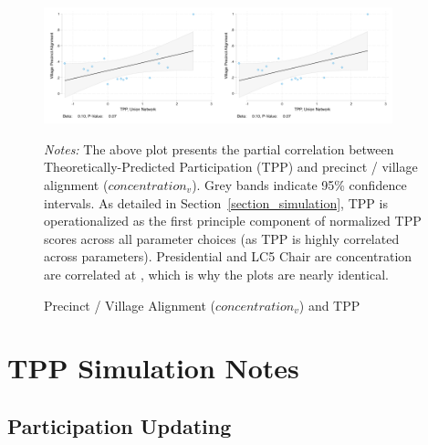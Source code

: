 \documentclass[12pt]{article}
\begin{document}
\begin{appendix}
\begin{figure}[h!]
\begin{center}
  \caption{Precinct / Village Alignment ($concentration_{v}$) and TPP}\label{figure_concentration_and_tpp}
\includegraphics[width=0.45\textwidth]{../3_results/precinct_alignment_pres.pdf}\includegraphics[width=0.45\textwidth]{../3_results/precinct_alignment_LC5chair.pdf}\\
\end{center}
\scriptsize{ \emph{Notes:}  The above plot presents the partial correlation between Theoretically-Predicted Participation (TPP) and precinct / village alignment ($concentration_{v}$). Grey bands indicate 95\% confidence intervals.  As detailed in Section~\ref{section_simulation}, TPP is operationalized as the first principle component of normalized TPP scores across all parameter choices (as TPP is highly correlated across parameters). Presidential and LC5 Chair are concentration are correlated at \unskip, which is why the plots are nearly identical.}
\end{figure}


\pagebreak

\section{TPP Simulation Notes}\label{appendix_tpp_notes}


\subsection{Participation Updating}


\end{appendix}
\end{document}
